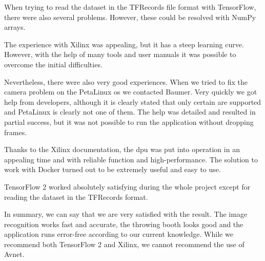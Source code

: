When trying to read the dataset in the TFRecords file format with TensorFlow, there were also several problems.
However, these could be resolved with NumPy arrays.

The experience with Xilinx was appealing, but it has a steep learning curve.
However, with the help of many tools and user manuals it was possible to overcome the initial difficulties.

Nevertheless, there were also very good experiences.
When we tried to fix the camera problem on the PetaLinux \acrshort{os} we contacted Baumer.
Very quickly we got help from developers, although it is clearly stated that only certain  are supported and PetaLinux is clearly not one of them.
The help was detailed and resulted in partial success, but it was not possible to run the application without dropping frames.

Thanks to the Xilinx documentation, the \acrshort{dpu} was put into operation in an appealing time and with reliable function and high-performance.
The solution to work with Docker turned out to be extremely useful and easy to use.

TensorFlow 2 worked absolutely satisfying during the whole project except for reading the dataset in the TFRecords format.

In summary, we can say that we are very satisfied with the result. 
The image recognition works fast and accurate, the throwing booth looks good and the application runs error-free according to our current knowledge.
While we recommend both TensorFlow 2 and Xilinx, we cannot recommend the use of Avnet.
